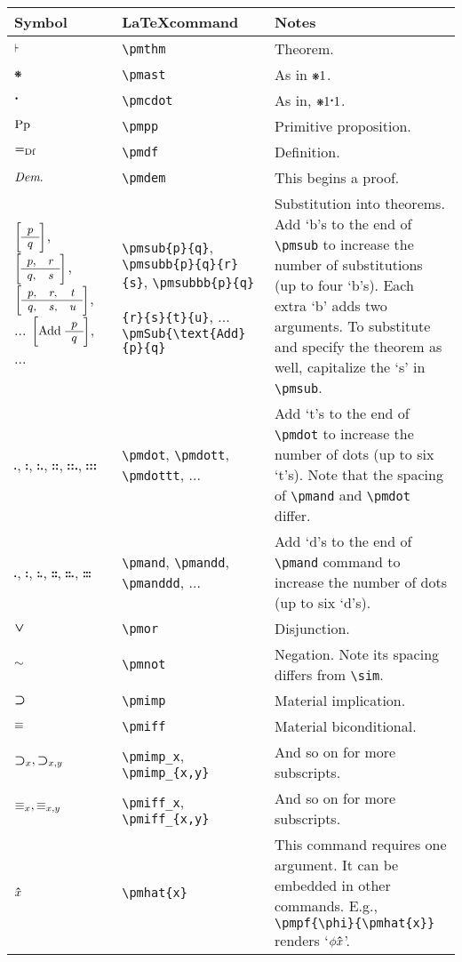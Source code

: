 \documentclass[12pt]{article}
\begin{document}
\noindent \begin{tabular}{@{}p{3cm} | p{5cm} | p{8.25cm}}
	\textbf{Symbol} & \textbf{\LaTeX command} & \textbf{Notes} \\ \hline
	$\pmthm$ & \verb|\pmthm| & Theorem. \\
	$\pmast$ & \verb|\pmast| & As in $\pmast1$.  \\ 
	$\pmcdot$ & \verb|\pmcdot| & As in, $\pmast1\pmcdot1$. \\
	$\pmpp$ & \verb|\pmpp| & Primitive proposition. \\
	$\pmdf$ & \verb|\pmdf| & Definition. \\
	$\pmdem$ & \verb|\pmdem| & This begins a proof. \\  
	$\pmsub{p}{q}$, $\pmsubb{p}{q}{r}{s}$, $\pmsubbb{p}{q}{r}{s}{t}{u}$, ... $\pmSub{\text{Add}}{p}{q}$, ... & \verb|\pmsub{p}{q}|, \verb|\pmsubb{p}{q}{r}{s}|, \verb|\pmsubbb{p}{q}| \par \hfill \verb|{r}{s}{t}{u}|, ... \verb|\pmSub{\text{Add}{p}{q}| & Substitution into theorems. Add `b's to the end of \verb|\pmsub| to increase the number of substitutions (up to four `b's). Each extra `b' adds two arguments. To substitute and specify the theorem as well, capitalize the `s' in \verb|\pmsub|. \\
	$\pmdot$, $\pmdott$, $\pmdottt$, $\pmdotttt$, $\pmdottttt$, $\pmdotttttt$ & \verb|\pmdot|, \verb|\pmdott|, \verb|\pmdottt|, ... & Add `t's to the end of \verb|\pmdot| to increase the number of dots (up to six `t's). Note that the spacing of \verb|\pmand| and \verb|\pmdot| differ. \\ 
	$\pmand$, $\pmandd$, $\pmanddd$, $\pmandddd$, $\pmanddddd$, $\pmandddddd$ & \verb|\pmand|, \verb|\pmandd|, \verb|\pmanddd|, ...& Add `d's to the end of \verb|\pmand| command to increase the number of dots (up to six `d's). \\ 
	$\pmor$ & \verb|\pmor| & Disjunction. \\
	$\pmnot$ & \verb|\pmnot| & Negation. Note its spacing differs from \verb|\sim|. \\
	$\pmimp$ & \verb|\pmimp| & Material implication. \\
	$\pmiff$ & \verb|\pmiff| & Material biconditional. \\
	$\pmimp_x, \pmimp_{x,y}$ & \verb|\pmimp_x|, \verb|\pmimp_{x,y}| & And so on for more subscripts. \\
	$\pmiff_x, \pmiff_{x,y}$ & \verb|\pmiff_x|, \verb|\pmiff_{x,y}| & And so on for more subscripts. \\
	$\pmhat{x}$ & \verb|\pmhat{x}| & This command requires one argument. It can be embedded in other commands. E.g., \verb|\pmpf{\phi}{\pmhat{x}}| renders `$\pmpf{\phi}{\pmhat{x}}$'. \\

\end{tabular}
\end{document}
